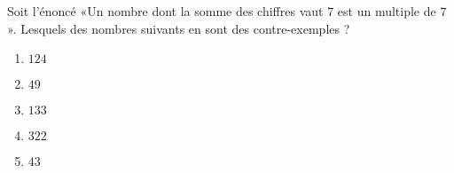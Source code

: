 
\begin{exercice}\label{exosmath-0890}

    Soit l'énoncé «Un nombre dont la somme des chiffres vaut \( 7\) est un multiple de \( 7\)». Lesquels des nombres suivants en sont des contre-exemples ?
    \begin{multicols}{2}
        \begin{enumerate}
            \item
                \( 124\)
            \item
                \( 49\)
            \item
                \( 133\)
            \item
                \( 322\)
            \item
                \( 43\)
        \end{enumerate}
    \end{multicols}


\end{exercice}
